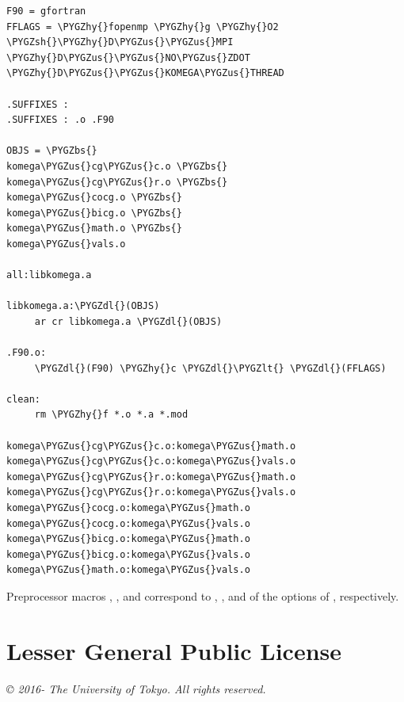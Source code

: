 \documentclass[letterpaper,10pt,dvipdfmx,openany]{sphinxmanual}
\def\PYGZbs{\char`\\}
\def\PYGZus{\char`\_}
\def\PYGZlt{\char`\<}
\def\PYGZsh{\char`\#}
\def\PYGZdl{\char`\$}
\def\PYGZhy{\char`\-}
\begin{document}
\begin{Verbatim}[commandchars=\\\{\}]
F90 = gfortran
FFLAGS = \PYGZhy{}fopenmp \PYGZhy{}g \PYGZhy{}O2 \PYGZsh{}\PYGZhy{}D\PYGZus{}\PYGZus{}MPI \PYGZhy{}D\PYGZus{}\PYGZus{}NO\PYGZus{}ZDOT \PYGZhy{}D\PYGZus{}\PYGZus{}KOMEGA\PYGZus{}THREAD

.SUFFIXES :
.SUFFIXES : .o .F90

OBJS = \PYGZbs{}
komega\PYGZus{}cg\PYGZus{}c.o \PYGZbs{}
komega\PYGZus{}cg\PYGZus{}r.o \PYGZbs{}
komega\PYGZus{}cocg.o \PYGZbs{}
komega\PYGZus{}bicg.o \PYGZbs{}
komega\PYGZus{}math.o \PYGZbs{}
komega\PYGZus{}vals.o

all:libkomega.a

libkomega.a:\PYGZdl{}(OBJS)
     ar cr libkomega.a \PYGZdl{}(OBJS)

.F90.o:
     \PYGZdl{}(F90) \PYGZhy{}c \PYGZdl{}\PYGZlt{} \PYGZdl{}(FFLAGS)

clean:
     rm \PYGZhy{}f *.o *.a *.mod

komega\PYGZus{}cg\PYGZus{}c.o:komega\PYGZus{}math.o
komega\PYGZus{}cg\PYGZus{}c.o:komega\PYGZus{}vals.o
komega\PYGZus{}cg\PYGZus{}r.o:komega\PYGZus{}math.o
komega\PYGZus{}cg\PYGZus{}r.o:komega\PYGZus{}vals.o
komega\PYGZus{}cocg.o:komega\PYGZus{}math.o
komega\PYGZus{}cocg.o:komega\PYGZus{}vals.o
komega\PYGZus{}bicg.o:komega\PYGZus{}math.o
komega\PYGZus{}bicg.o:komega\PYGZus{}vals.o
komega\PYGZus{}math.o:komega\PYGZus{}vals.o
\end{Verbatim}

Preprocessor macros , , and  correspond to
, , and  of the options of , respectively.


\section{Lesser General Public License}
\label{komega_copyright_en:lesser-general-public-license}\label{komega_copyright_en:lgplicense}
\emph{© 2016- The University of Tokyo. All rights reserved.}
\end{document}
